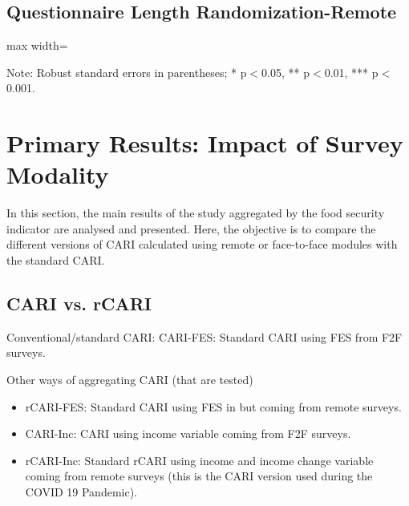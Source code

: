 \documentclass[11pt,harvard]{article}
\begin{document}
\pagebreak
	
	
\subsection{Questionnaire Length Randomization-Remote}
	
	\begin{table}[htbp]
		\centering
		\begin{adjustbox}{max width=\textwidth}
			\begin{threeparttable}
				\caption{Balance Table for Randomized Questionnaire Length Assignment in Remote Survey: Long vs. Short}
				\scriptsize
				 
				\label{tab:CAR_Listing_Demo_Balance_RM_Length}
				\begin{tablenotes}
					\item Note: Robust standard errors in parentheses; * p$<$0.05, ** p$<$0.01, *** p$<$0.001.
				\end{tablenotes}
			\end{threeparttable}
		\end{adjustbox}
	\end{table}
	
\pagebreak
	
	
\section{Primary Results: Impact of Survey Modality}
	
In this section, the main results of the study aggregated by the food security indicator are analysed and presented. Here, the objective is to compare the different versions of CARI calculated using remote or face-to-face modules with the standard CARI.
	
\subsection{CARI vs. rCARI}

Conventional/standard CARI:  CARI-FES: Standard CARI using FES from F2F surveys.
	
Other ways of aggregating CARI (that are tested)

	\begin{itemize}[label=--, left=1.5em]
		\item rCARI-FES: Standard CARI using FES in but coming from remote surveys.
		\item CARI-Inc: CARI using income variable coming from F2F surveys.
		\item rCARI-Inc: Standard rCARI using income and income change variable coming from remote surveys (this is the CARI version used during the COVID 19 Pandemic).
	\end{itemize}
\end{document}
